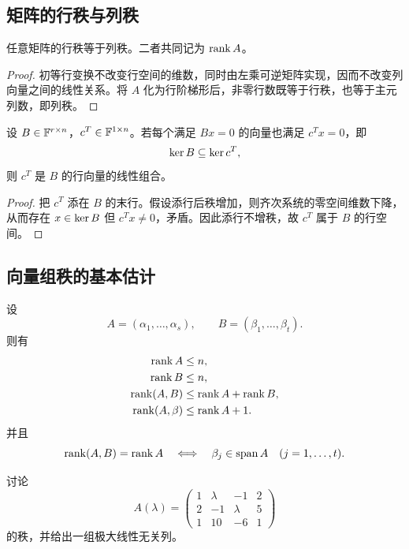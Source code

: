 \subsection{矩阵的行秩与列秩}

\begin{theorem}
任意矩阵的行秩等于列秩。二者共同记为 $\operatorname{rank} A$。
\end{theorem}

\begin{proof}
初等行变换不改变行空间的维数，同时由左乘可逆矩阵实现，因而不改变列向量之间的线性关系。将 $A$ 化为行阶梯形后，非零行数既等于行秩，也等于主元列数，即列秩。
\end{proof}

\begin{proposition}[由解集包含推出行向量包含]
设 $B\in\mathbb F^{r\times n}$，$c^T\in\mathbb F^{1\times n}$。若每个满足 $Bx=0$ 的向量也满足 $c^Tx=0$，即
\begin{equation}
 \operatorname{ker} B\subseteq\operatorname{ker} c^T,
\end{equation}
则 $c^T$ 是 $B$ 的行向量的线性组合。
\end{proposition}

\begin{proof}
把 $c^T$ 添在 $B$ 的末行。假设添行后秩增加，则齐次系统的零空间维数下降，从而存在 $x\in\operatorname{ker} B$ 但 $c^Tx\neq0$，矛盾。因此添行不增秩，故 $c^T$ 属于 $B$ 的行空间。
\end{proof}

\subsection{向量组秩的基本估计}

设
\begin{equation}
 A=(\alpha_1,\ldots,\alpha_s),
 \qquad
 B=(\beta_1,\ldots,\beta_t).
\end{equation}
则有
\begin{align}
 \operatorname{rank} A&\leq n,\\
 \operatorname{rank} B&\leq n,\\
 \operatorname{rank}(A,B)&\leq\operatorname{rank} A+\operatorname{rank} B,\\
 \operatorname{rank}(A,\beta)&\leq\operatorname{rank} A+1.
\end{align}
并且
\begin{equation}
 \operatorname{rank}(A,B)=\operatorname{rank} A
 \quad\Longleftrightarrow\quad
 \beta_j\in\operatorname{span} A\quad(j=1,\ldots,t).
\end{equation}

\begin{exercise}[参数矩阵的秩与极大无关列组]
讨论
\begin{equation}
 A(\lambda)=
 \begin{pmatrix}
 1&\lambda&-1&2\\
 2&-1&\lambda&5\\
 1&10&-6&1
 \end{pmatrix}
\end{equation}
的秩，并给出一组极大线性无关列。
\end{exercise}

